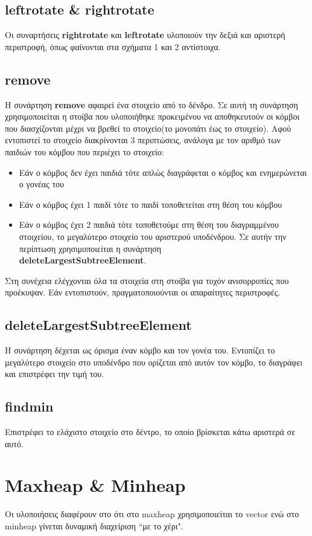 \documentclass[12pt,a4paper]{article}
\begin{document}
    \subsection{leftrotate \& rightrotate}
    Οι συναρτήσεις \textbf{rightrotate} και \textbf{leftrotate} υλοποιούν την δεξιά και αριστερή περιστροφή, όπως φαίνονται στα σχήματα 1 και 2 
    αντίστοιχα.
    \subsection{remove}
    Η συνάρτηση \textbf{remove} αφαιρεί ένα στοιχείο από το δένδρο. Σε αυτή τη συνάρτηση χρησιμοποιείται η στοίβα που υλοποιήθηκε προκειμένου να αποθηκευτούν οι 
    κόμβοι που διασχίζονται μέχρι να βρεθεί το στοιχείο(το μονοπάτι έως το στοιχείο). Αφού εντοπιστεί το στοιχείο διακρίνονται 3 περιπτώσεις, ανάλογα με τον 
    αριθμό των παιδιών του κόμβου που  περιέχει το στοιχείο:
    \begin{itemize}
        \item Εάν ο κόμβος δεν έχει παιδιά τότε απλώς διαγράφεται ο κόμβος και ενημερώνεται ο γονέας του
        \item Εάν ο κόμβος έχει 1 παιδί τότε το παιδί τοποθετείται στη θέση του κόμβου
        \item Εάν ο κόμβος έχει 2 παιδιά τότε τοποθετούμε στη θέση του διαγραμμένου στοιχείου, το μεγαλύτερο στοιχείο του αριστερού υποδένδρου. Σε αυτήν την 
        περίπτωση χρησιμοποιείται η συνάρτηση\\ \textbf{deleteLargestSubtreeElement}.
    \end{itemize}
    Στη συνέχεια ελέγχονται όλα τα στοιχεία στη στοίβα για τυχόν ανισορροπίες που προέκυψαν. Εάν εντοπιστούν, πραγματοποιούνται οι απαραίτητες περιστροφές.
    \subsection{deleteLargestSubtreeElement}
    Η συνάρτηση δέχεται ως όρισμα έναν κόμβο και τον γονέα του. Εντοπίζει το μεγαλύτερο στοιχείο στο υποδένδρο που ορίζεται από αυτόν τον κόμβο, το διαγράφει και 
    επιστρέφει την τιμή του.
    \subsection{findmin}
    Επιστρέφει το ελάχιστο στοιχείο στο δέντρο, το οποίο βρίσκεται κάτω αριστερά σε αυτό.
    \section{Maxheap \& Minheap}
    Οι υλοποιήσεις διαφέρουν στο ότι στο maxheap χρησιμοποιείται το vector ενώ στο minheap γίνεται δυναμική διαχείριση ``με το χέρι".
\end{document}
